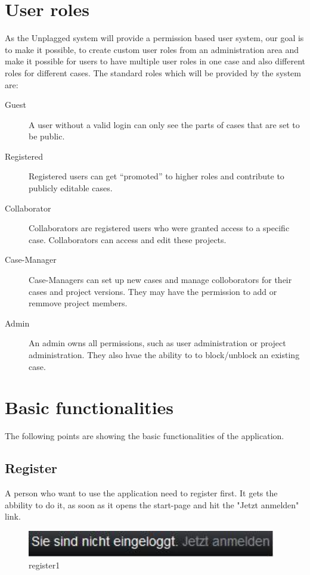 \section{User roles}
As the Unplagged system will provide a permission based user system, our goal is to make it possible, to create custom user roles from an administration area and make it possible for users to have multiple user roles in one case and also different roles for different cases.
The standard roles which will be provided by the system are:

\begin{description}
\item[Guest]
A user without a valid login can only see the parts of cases that are set to be public.
\item[Registered]
Registered users can get \enquote{promoted} to higher roles and contribute to publicly editable cases.
\item[Collaborator]
Collaborators are registered users who were granted access to a specific case. Collaborators can access and edit these projects.
\item[Case-Manager]
Case-Managers can set up new cases and manage colloborators for their cases and project versions. They may have the permission to add or remmove project members.
\item[Admin]
An admin owns all permissions, such as user administration or project administration. They also hvae the ability to to block/unblock an existing case.
\end{description}

\section{Basic functionalities}
The following points are showing the basic functionalities of the application.
\subsection{Register}
A person who want to use the application need to register first. It gets the abbility to do it, as soon as it opens the start-page and hit the "Jetzt anmelden" link.
\begin{figure}[!ht]
  \centering
    \includegraphics[width=0.97\textwidth]{images/basic_functionalities/reg1.jpg}
  \caption{register1}
  \label{fig:register1}
\end{figure}

